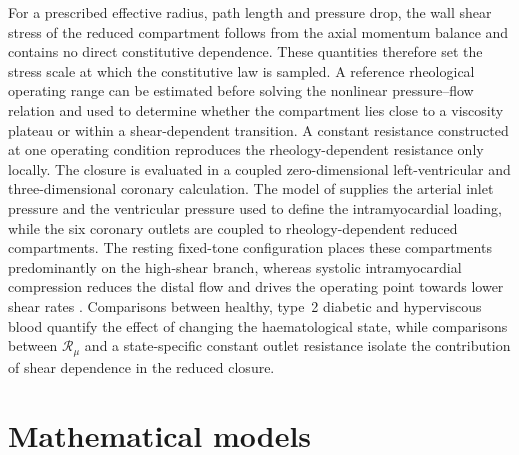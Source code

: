 \documentclass[lineno]{jfm}
\begin{document}
For a prescribed effective radius, path length and pressure drop, the wall
shear stress of the reduced compartment follows from the axial momentum balance
and contains no direct constitutive dependence. These quantities therefore set
the stress scale at which the constitutive law is sampled. A reference
rheological operating range can be estimated before solving the nonlinear
pressure--flow relation and used to determine whether the compartment lies
close to a viscosity plateau or within a shear-dependent transition. A
constant resistance constructed at one operating condition reproduces the
rheology-dependent resistance only locally.
The closure is evaluated in a coupled zero-dimensional left-ventricular and
three-dimensional coronary calculation. The model of
\citet{caruel2014dimensional} supplies the arterial inlet pressure and the
ventricular pressure used to define the intramyocardial loading, while the six
coronary outlets are coupled to rheology-dependent reduced compartments.
The resting fixed-tone configuration places these compartments predominantly
on the high-shear branch, whereas systolic intramyocardial compression reduces
the distal flow and drives the operating point towards lower shear rates
\citep{Downey1975,Permutt1963}.
Comparisons between healthy, type~2 diabetic and hyperviscous blood quantify
the effect of changing the haematological state, while comparisons between
$\mathcal{R}_{\mu}$ and a state-specific constant outlet resistance isolate
the contribution of shear dependence in the reduced closure.

\section{Mathematical models}
\label{sec:models}
\end{document}
